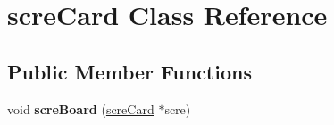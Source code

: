 \hypertarget{classscre_card}{}\section{scre\+Card Class Reference}
\label{classscre_card}
\subsection*{Public Member Functions}
\begin{DoxyCompactItemize}
\item 
\mbox{\label{classscre_card_a85c6f2e648561d4044d034c96664c5b6}} 
void {\bfseries scre\+Board} (\hyperlink{classscre_card}{scre\+Card} $\ast$scre)
\end{DoxyCompactItemize}
